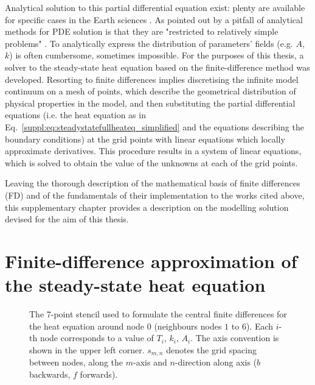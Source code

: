Analytical solution to this partial differential equation exist: plenty are available for specific cases in the Earth sciences \parencites(see e.g. )()[][chapter 4.6]{Turcotte2014_geodynamics}[][chapter 3.4]{stuwe2007geodynamics}.
As pointed out by \textcite{Gerya2010} a pitfall of analytical methods for PDE solution is that they are "restricted to relatively simple problems" \parencite[][chapter 3.1]{Gerya2010}.
To analytically express the distribution of parameters' fields (e.g. $A$, $k$) is often cumbersome, sometimes impossible.
For the purposes of this thesis, a solver to the steady-state heat equation based on the finite-difference method \parencites()()[][chapter 4.2]{Patankar1980}[][chapter 10]{Gerya2010} was developed.
Resorting to finite differences implies discretising the infinite model continuum on a mesh of points, which describe the geometrical distribution of physical properties in the model, and then substituting the partial differential equations (i.e. the heat equation as in Eq.~\ref{suppl:eq:steadystatefullheateq_simplified} and the equations describing the boundary conditions) at the grid points with linear equations which locally approximate derivatives.
This procedure results in a system of linear equations, which is solved to obtain the value of the unknowns at each of the grid points.

Leaving the thorough description of the mathematical basis of finite differences (FD) and of the fundamentals of their implementation to the works cited above, this supplementary chapter provides a description on the modelling solution devised for the aim of this thesis.

\section[
    tocentry={Finite-difference approximation of the steady-state heat equation},
    head={FD approximation of the steady-state heat equation}
    ]{Finite-difference approximation of the steady-state heat equation}
\label{s:ThermModel:FD}

\FloatBarrier

\begin{figure}[hb] %
    \begin{adjustbox}{center}
    \end{adjustbox}
    \caption[The 7-point stencil used to formulate the central finite differences.]{The 7-point stencil used to formulate the central finite differences for the heat equation around node $0$ (neighbours nodes $1$ to $6$).
    Each $i$-th node corresponds to a value of $T_i$, $k_i$, $A_i$.
    The axis convention is shown in the upper left corner.
    $s_{m,n}$ denotes the grid spacing between nodes, along the $m$-axis and $n$-direction along axis ($b$ backwards, $f$ forwards).}
    \label{suppl:fig:stencil}
\end{figure}

